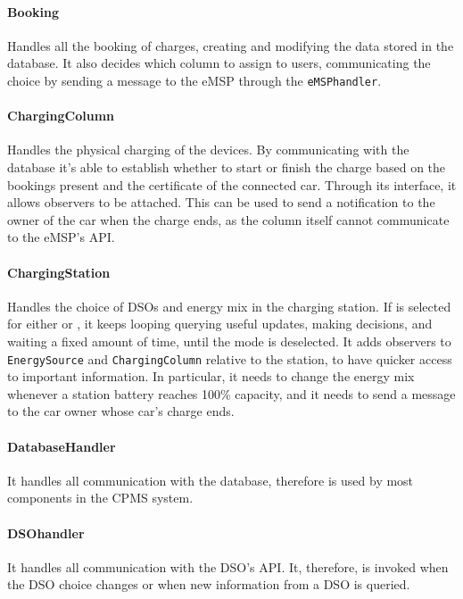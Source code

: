\paragraph {Booking} Handles all the booking of charges, creating and modifying the data stored in the database. It also decides which column to assign to users, communicating the choice by sending a message to the eMSP through the \texttt{eMSPhandler}.

\paragraph {ChargingColumn} Handles the physical charging of the devices. By communicating with the database it's able to establish whether to start or finish the charge based on the bookings present and the certificate of the connected car. Through its interface, it allows observers to be attached. This can be used to send a notification to the owner of the car when the charge ends, as the column itself cannot communicate to the eMSP's API. 

\paragraph {ChargingStation} Handles the choice of DSOs and energy mix in the charging station. If  is selected for either  or , it keeps looping querying useful updates, making decisions, and waiting a fixed amount of time, until the mode is deselected. It adds observers to \texttt{EnergySource} and \texttt{ChargingColumn} relative to the station, to have quicker access to important information. In particular, it needs to change the energy mix whenever a station battery reaches 100\% capacity, and it needs to send a message to the car owner whose car's charge ends.

\paragraph {DatabaseHandler} It handles all communication with the database, therefore is used by most components in the CPMS system.

\paragraph {DSOhandler} It handles all communication with the DSO's API. It, therefore, is invoked when the DSO choice changes or when new information from a DSO is queried.

